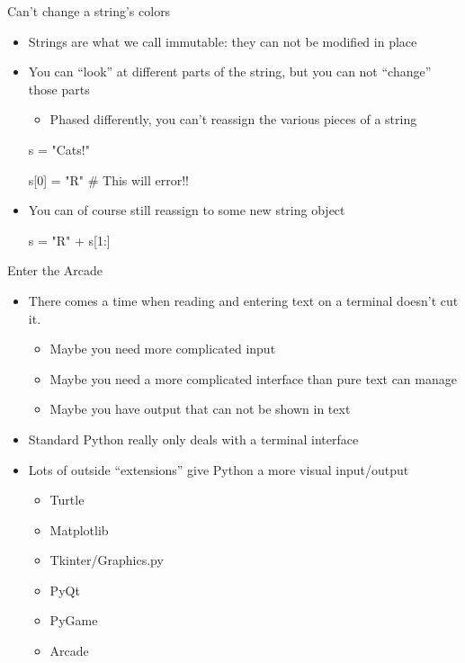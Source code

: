 \documentclass[pdf, aspectratio=169, 12pt]{beamer}
\begin{document}
\begin{frame}[fragile]{Can't change a string's colors}
	\begin{itemize}
		\item Strings are what we call \alert{immutable}: they can not be modified in place
		\item You can ``look'' at different parts of the string, but you can not ``change'' those parts
			\begin{itemize}
				\item Phased differently, you can't reassign the various pieces of a string
			\end{itemize}
			
			\begin{pythoncode}
				s = "Cats!"

				s[0] = "R"			# This will error!!
			\end{pythoncode}
		\item You can of course still reassign  to some new string object
			\begin{pythoncode}
				s = "R" + s[1:]
			\end{pythoncode}
	\end{itemize}
\end{frame}

\begin{frame}{Enter the Arcade}
	\vspace{5mm}
	\begin{itemize}
		\item There comes a time when reading and entering text on a terminal doesn't cut it.
			\begin{itemize}
				\item Maybe you need more complicated input
				\item Maybe you need a more complicated interface than pure text can manage
				\item Maybe you have output that can not be shown in text
			\end{itemize}
		\item Standard Python really only deals with a terminal interface
		\item Lots of outside ``extensions'' give Python a more visual input/output
			\begin{itemize}[<+->]
				\item Turtle
				\item Matplotlib
				\item Tkinter/Graphics.py
				\item PyQt
				\item PyGame
				\item \alert{Arcade}
			\end{itemize}
	\end{itemize}
\end{frame}
\end{document}
